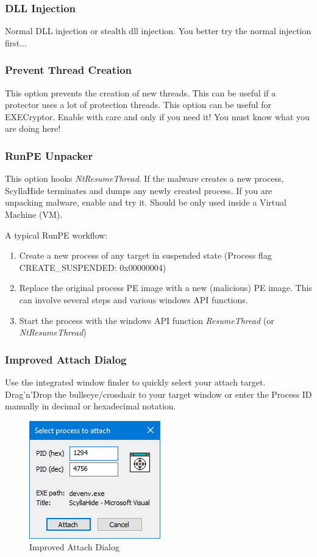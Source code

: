 \documentclass[10pt,a4paper]{article}
\begin{document}
\subsubsection{DLL Injection}
Normal DLL injection or stealth dll injection. You better try the normal injection first...

\subsubsection{Prevent Thread Creation}
This option prevents the creation of new threads. This can be useful if a protector uses a lot of protection threads. This option can be useful for EXECryptor. Enable with care and only if you need it! You must know what you are doing here!

\subsubsection{RunPE Unpacker}
This option hooks \textit{NtResumeThread}. If the malware creates a new process, ScyllaHide terminates and dumps any newly created process. If you are unpacking malware, enable and try it. Should be only used inside a Virtual Machine (VM).

A typical RunPE workflow:

\begin{enumerate}
\item Create a new process of any target in suspended state (Process flag CREATE\_SUSPENDED: 0x00000004)
\item Replace the original process PE image with a new (malicious) PE image. This can involve several steps and various windows API functions.
\item Start the process with the windows API function \textit{ResumeThread} (or \textit{NtResumeThread})
\end{enumerate}

\subsubsection{Improved Attach Dialog}
Use the integrated window finder to quickly select your attach target. Drag'n'Drop the bullseye/crosshair to your target window or enter the Process ID manually in decimal or hexadecimal notation.
\begin{figure}[H]
\centering
\includegraphics[scale=1]{newattachdialog.PNG}
\caption{Improved Attach Dialog}
\end{figure}
\end{document}
